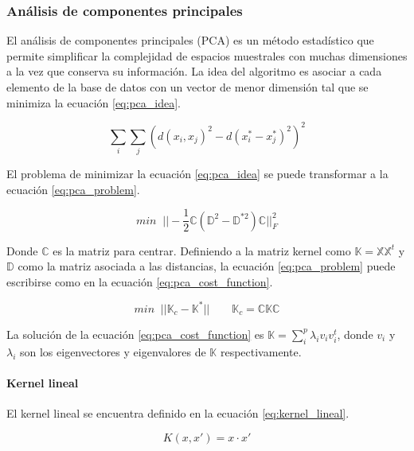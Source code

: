\subsubsection{Análisis de componentes principales}

El análisis de componentes principales (PCA) es un método estadístico que permite simplificar la complejidad de espacios muestrales con muchas dimensiones a la vez que conserva su información. La idea del algoritmo es asociar a cada elemento de la base de datos con un vector de menor dimensión tal que se minimiza la ecuación \ref{eq:pca_idea}.

\begin{equation}
    \sum_i \sum_j (d(x_i,x_j)^2-d(x^*_i-x_j^*)^2)^2
    \label{eq:pca_idea}
\end{equation}

El problema de minimizar la ecuación \ref*{eq:pca_idea} se puede transformar a la ecuación \ref{eq:pca_problem}.

\begin{equation}
    min\;\; ||-\frac{1}{2}\mathbb{C}(\mathbb{D}^2-\mathbb{D}^{*2})\mathbb{C}||_F^2
    \label{eq:pca_problem}
\end{equation}

Donde $\mathbb{C}$ es la matriz para centrar. Definiendo a la matriz kernel como $\mathbb{K}=\mathbb{X}\mathbb{X}^t$ y $\mathbb{D}$ como la matriz asociada a las distancias, la ecuación \ref{eq:pca_problem} puede escribirse como en la ecuación \ref{eq:pca_cost_function}.

\begin{equation}
    min\;\; ||\mathbb{K}_c-\mathbb{K}^*|| \qquad \mathbb{K}_c = \mathbb{C}\mathbb{K}\mathbb{C}
    \label{eq:pca_cost_function}
\end{equation}

La solución de la ecuación \ref{eq:pca_cost_function} es $\mathbb{K}=\sum\limits_i^p \lambda_i v_i v_i^t $, donde $v_i$ y $\lambda_i$ son los eigenvectores y eigenvalores de $\mathbb{K}$ respectivamente.

\paragraph{Kernel lineal}

El kernel lineal se encuentra definido en la ecuación \ref{eq:kernel_lineal}.

\begin{equation}
    K(x,x') = x \cdot x'
    \label{eq:kernel_lineal}
\end{equation}

